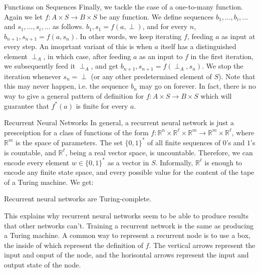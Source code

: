 \documentclass[10pt]{beamer}
\newcommand{\R}{\mathbb{R}}
\begin{document}
\begin{frame}{Functions on Sequences}
Finally, we tackle the case of a one-to-many function. Again we let $f:A\times S\to B\times S$ be any function. We define sequences $b_1,...,b_i,...$ and $s_1,...,s_i,...$ as follows. $b_1,s_1=f(a,\perp)$, and for every $n$, $b_{n+1}, s_{n+1}=f(a, s_n)$. In other words, we keep iterating $f$, feeding $a$ as input at every step. An imoprtant variant of this is when $a$ itself has a distinguished element $\perp_A$, in which case, after feeding $a$ as an input to $f$ in the first iteration, we subsequently feed it $\perp_A$, and get $b_{n+1}, s_{n+1}=f(\perp_A, s_n)$.  We stop the iteration whenever $s_n=\perp$ (or any other predetermined element of $S$). Note that this may never happen, i.e. the sequence $b_n$ may go on forever. In fact, there is no way to give a general pattern of definition for $f:A\times S\to B\times S$ which will guarantee that $f^*(a)$ is finite for every $a$.
\end{frame}

\begin{frame}{Recurrent Neural Networks}
  In general, a recurrent neural network is just a presceiption for a class of functions of the form $f:\R^n\times \R^\ell\times\R^m\to \R^m\times \R^\ell$, where $\R^m$ is the space of parameters. The set $\{0,1\}^*$ of all finite sequences of $0$'s and $1$'s is countable, and $\R^\ell$, being a real vector space,
  is uncountable.  Therefore, we can encode every element $w\in\{0,1\}^*$ as a vector in $S$.  Informally,
  $\R^\ell$ is enough to encode any finite state space, and every possible value for the content of the tape of a
  Turing machine. We get:

  \begin{theorem}
  Recurrent neural networks are Turing-complete.
  \end{theorem}

  This explains why recurrent neural networks seem to be able to produce results that other networks can't. Training a recurrent network is the same as producing a Turing machine.  A common way to represent a recurrent node is to use a box, the inside of which represent the definition of $f$.  The vertical arrows represent the input and onput of the node, and the horisontal arrows represent the input and output state of the node.
\end{frame}
\end{document}
